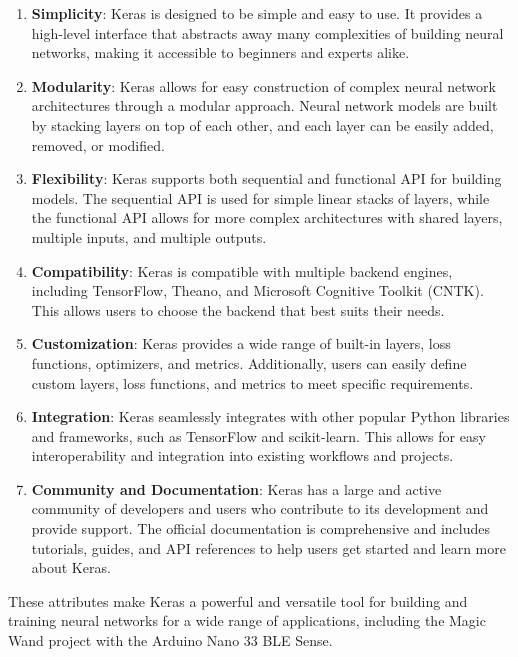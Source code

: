 	\begin{enumerate}
		\item \textbf{Simplicity}: Keras is designed to be simple and easy to use. It provides a high-level interface that abstracts away many complexities of building neural networks, making it accessible to beginners and experts alike.
		
		\item \textbf{Modularity}: Keras allows for easy construction of complex neural network architectures through a modular approach. Neural network models are built by stacking layers on top of each other, and each layer can be easily added, removed, or modified.
		
		\item \textbf{Flexibility}: Keras supports both sequential and functional API for building models. The sequential API is used for simple linear stacks of layers, while the functional API allows for more complex architectures with shared layers, multiple inputs, and multiple outputs.
		
		\item \textbf{Compatibility}: Keras is compatible with multiple backend engines, including TensorFlow, Theano, and Microsoft Cognitive Toolkit (CNTK). This allows users to choose the backend that best suits their needs.
		
		\item \textbf{Customization}: Keras provides a wide range of built-in layers, loss functions, optimizers, and metrics. Additionally, users can easily define custom layers, loss functions, and metrics to meet specific requirements.
		
		\item \textbf{Integration}: Keras seamlessly integrates with other popular Python libraries and frameworks, such as TensorFlow and scikit-learn. This allows for easy interoperability and integration into existing workflows and projects.
		
		\item \textbf{Community and Documentation}: Keras has a large and active community of developers and users who contribute to its development and provide support. The official documentation is comprehensive and includes tutorials, guides, and API references to help users get started and learn more about Keras.
	\end{enumerate}
	
	These attributes make Keras a powerful and versatile tool for building and training neural networks for a wide range of applications, including the Magic Wand project with the Arduino Nano 33 BLE Sense.
	
